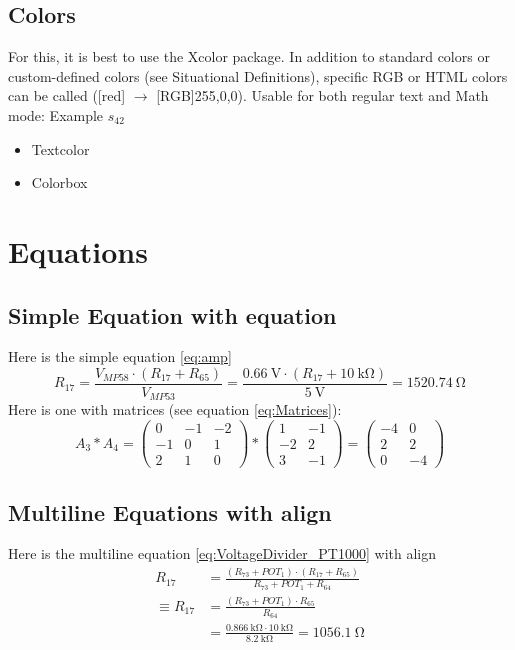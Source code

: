 \documentclass{scrartcl}
\begin{document}
\subsection{Colors}
For this, it is best to use the Xcolor package. In addition to standard colors or custom-defined colors (see Situational Definitions), specific RGB or HTML colors can be called ([red] $\to$ [RGB]{255,0,0}). Usable for both regular text and Math mode: \textcolor[RGB]{255,0,0}{Example $s_{42}$}
\begin{itemize}
	\item \textcolor[RGB]{100,100,100}{Textcolor}
	\item \colorbox{codegreen}{Colorbox}
\end{itemize}

\section{Equations}
\subsection{Simple Equation with equation}
Here is the simple equation \ref{eq:amp}
\begin{equation}
	\label{eq:amp}
	R_{17}=\frac{V_{MP58}\cdot (R_{17}+R_{65})}{V_{MP53}} = \frac{\SI{0.66}{\volt}\cdot (R_{17}+\SI{10}{\kilo\ohm})}{\SI{5}{\volt}}=\SI{1520.74}{\ohm}
\end{equation}
Here is one with matrices (see equation \ref{eq:Matrices}):
\begin{equation}
	\label{eq:Matrices}
	A_3*A_4=
	\left(\begin{array}{ccc}
			0  & -1 & -2 \\
			-1 & 0  & 1  \\
			2  & 1  & 0
		\end{array}\right)
	*
	\left(\begin{array}{cc}
			1  & -1 \\
			-2 & 2  \\
			3  & -1
		\end{array}\right)
	=
	\left(\begin{array}{cc}
			-4 & 0  \\
			2  & 2  \\
			0  & -4
		\end{array}\right)
\end{equation}
\subsection{Multiline Equations with align}
Here is the multiline equation \ref{eq:VoltageDivider_PT1000} with align
\begin{align}
	\label{eq:VoltageDivider_PT1000}
	R_{17}        & =\frac{(R_{73}+POT_1)\cdot(R_{17}+R_{65})}{R_{73}+POT_1+R_{64}}                             \\
	\equiv R_{17} & =\frac{(R_{73}+POT_1)\cdot R_{65}}{R_{64}}                                                  \\
	              & =\frac{\SI{0.866}{\kilo\ohm}\cdot\SI{10}{\kilo\ohm}}{\SI{8.2}{\kilo\ohm}}=\SI{1056.1}{\ohm}
\end{align}
\end{document}
